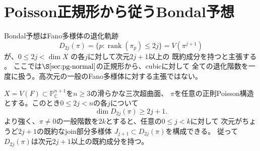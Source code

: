 \section{Poisson正規形から従うBondal予想}
\label{sec:pg-bondal}

Bondal予想はFano多様体の退化軌跡
\[
 D_{2j}(\pi)=\{p:\operatorname{rank}(\pi_p)\le2j\}
 =V(\pi^{j+1})
\]
が、$0\le 2j<\dim X$ の各$j$に対して次元$2j+1$以上の
既約成分を持つと主張する
\cite{BondalGualtieriPym,BondalDruelPereiraPymTouzet}。
ここでは$\S\ref{sec:pg-normal}$の正規形から、cubicに対して
全ての退化階数を一度に扱う。高次元の一般のFano多様体に対する主張ではない。

\begin{theorem}[滑らかなcubicに対するBondal予想]
\label{thm:pg-bondal}
$X=V(F)\subset\mathbb P^{n+1}_{\mathbb C}$を$n\ge3$の滑らかな三次超曲面、
$\pi$を任意の正則Poisson構造とする。このとき$0\le 2j<n$の各$j$について
\[
 \boxed{\quad \dim D_{2j}(\pi)\ge 2j+1.\quad}
\]
より強く、$\pi\ne0$の一般階数を$2k$とすると、任意の$0\le j<k$に対して
次元がちょうど$2j+1$の既約なjoin部分多様体
$J_{j+1}\subset D_{2j}(\pi)$を構成できる。
従って$D_{2j}(\pi)$は次元$2j+1$以上の既約成分を持つ。
\end{theorem}

